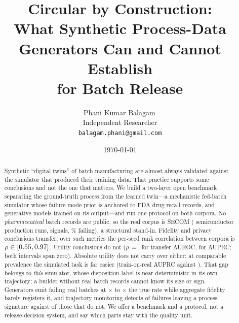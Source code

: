 \documentclass[11pt]{article}
\title{\textbf{Circular by Construction:\\ What Synthetic Process-Data Generators
Can and Cannot Establish\\ for Batch Release}}
\author{Phani Kumar Balagam\,\orcidlink{0009-0007-6762-399X}\\
\small Independent Researcher\\
\small \texttt{balagam.phani@gmail.com}}
\date{\today}
\newcommand{\corpusreal}{SECOM}
\begin{document}
\maketitle

\begin{abstract}
\noindent
Synthetic ``digital twins'' of batch manufacturing are almost always validated
against the simulator that produced their training data. That practice
supports some conclusions and not the one that matters. We build a two-layer
open benchmark separating the ground-truth process from the learned
twin---a mechanistic fed-batch simulator whose failure-mode prior is anchored to
\recallRecords{} FDA drug-recall records, and \nMethods{} generative models
trained on its output---and run one protocol on both corpora. No \emph{pharmaceutical} batch records are public, so
the real corpus is \corpusreal{} (\secomRuns{} semiconductor production runs,
\secomSignals{} signals, \secomFailRate{}\% failing), a structural stand-in.
Fidelity and privacy conclusions transfer: over \agreeFidPrivN{} such metrics
the per-seed rank correlation between corpora is
$\rho \in [0.55{}, 0.97{}]$. Utility conclusions do not
($\rho$~=~\ciAurocRho{} for transfer AUROC, \ciAuprcRho{} for AUPRC; both
intervals span zero). Absolute utility does not carry over either: at comparable
prevalence the simulated task is far easier (train-on-real AUPRC
\trtrAuprcSim{} against \trtrAuprcReal{}). That gap belongs to \emph{this}
simulator, whose disposition label is near-deterministic in its own trajectory;
a builder without real batch records cannot know its size or sign.
Generators emit failing real batches at
\sprRatioVaeReal{}$\times$ to \sprRatioGaussianReal{}$\times$ the true rate
while aggregate fidelity barely registers it, and trajectory monitoring detects
\monDetObs{} of failures leaving a process signature against \monDetUnobs{} of
those that do not. We offer a benchmark and a protocol, not a release-decision
system, and say which parts stay with the quality unit.
\end{abstract}

\vspace{0.5em}
\noindent{}
\end{document}
